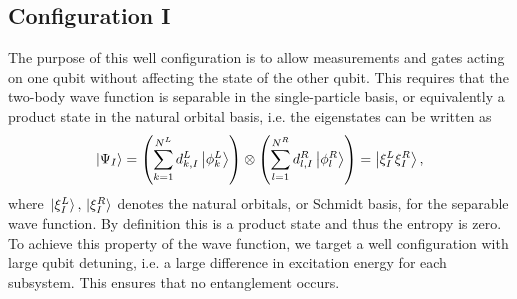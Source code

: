 \documentclass[twocolumn,superscriptaddress,unsortedaddress,
 amsmath,amssymb,
 aps,
]{revtex4-2}
\begin{document}
    \subsection{Configuration I}

        The purpose of this well configuration is to allow measurements and gates acting on one qubit without affecting the state of the other qubit. This requires that the two-body wave function is separable in the single-particle basis, or equivalently a product state in the natural orbital basis, i.e. the eigenstates can be written as
        \begin{align*}
            \ket{\Psi_I}
            = \qty(
                \sum_{k = 1}^{N^L}
                d^L_{k, I} \ket{\phi^L_k}
            ) \otimes \qty(
                \sum_{l = 1}^{N^R}
                d^R_{l, I} \ket{\phi^R_l}
            )
            = \ket{\xi^L_I \xi^{R}_I},
        \end{align*}
        where $\ket*{\xi^L_I}, \ket*{\xi^R_I}$ denotes the natural orbitals, or
        Schmidt basis, for the separable wave function. By definition this is a product state and thus the entropy is zero. To achieve this property of the wave function, we target a well configuration with large qubit detuning, i.e. a large difference in excitation energy for each subsystem. This ensures that no entanglement occurs.  %
\end{document}
